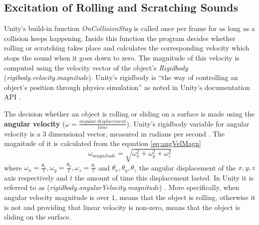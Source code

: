 
\subsection{Excitation of Rolling and Scratching Sounds}
Unity's build-in function \textit{OnCollisionStay} \cite{bib:unity_doc} is called once per frame for as long as a collision keeps happening. Inside this function the program decides whether rolling or scratching takes place and calculates the corresponding velocity which stops the sound when it goes down to zero. The magnitude of this velocity is computed using the velocity vector of the object's \textit{Rigidbody} (\textit{rigibody.velocity.magnitude}). Unity's rigidbody is ``the way of controlling an object's position through physics simulation'' as noted in Unity's documentation API \cite{bib:unity_doc}.

The decision whether an object is rolling or sliding on a surface is made using the \textbf{angular velocity} ($\omega = \frac{angular\ displacement}{time}$). Unity's rigidbody variable for angular velocity is a 3 dimensional vector, measured in radians per second \cite{bib:unity_doc}. The magnitude of it is calculated from the equation \ref{eq:angVelMagn}
\begin{equation}\label{eq:angVelMagn}
\omega_{magnitude} = \sqrt{\omega_x^2+\omega_y^2+\omega_z^2}
\end{equation}
where $\omega_x = \frac{\theta_x}{t}, \omega_y = \frac{\theta_y}{t}, \omega_z = \frac{\theta_z}{t}$ and $\theta_x, \theta_y, \theta_z$ the angular displacement of the $x, y, z$ axis respectively and $t$ the amount of time this displacement lasted. In Unity it is referred to as (\textit{rigidbody.angularVelocity.magnitude}) \cite{bib:unity_doc}. More specifically, when angular velocity magnitude is over $1$, means that the object is rolling, otherwise it is not and providing that linear velocity is non-zero, means that the object is sliding on the surface. 








